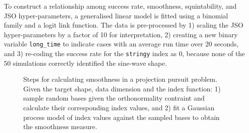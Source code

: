 \documentclass[
  12pt,
]{interact}
\theoremstyle{plain}
\begin{document}
To construct a relationship among success rate, smoothness,
squintability, and JSO hyper-parameters, a generalised linear model is
fitted using a binomial family and a logit link function. The data is
pre-processed by 1) scaling the JSO hyper-parameters by a factor of 10
for interpretation, 2) creating a new binary variable
\texttt{long\_time} to indicate cases with an average run time over 20
seconds, and 3) re-coding the success rate for the \texttt{stringy}
index as 0, because none of the 50 simulations correctly identified the
sine-wave shape.

\begin{figure}


\caption{\label{fig-smoothness}Steps for calculating smoothness in a
projection pursuit problem. Given the target shape, data dimension and
the index function: 1) sample random bases given the orthonormality
contraint and calculate their corresponding index values, and 2) fit a
Gaussian process model of index values against the sampled bases to
obtain the smoothness measure.}

\end{figure}%
\end{document}
